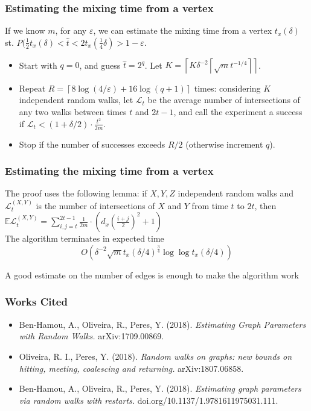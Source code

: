\documentclass{beamer}
\newcommand{\E}{\mathbb{E}}
\newcommand{\ceil}[1]{\left\lceil #1 \right\rceil}
\newcommand{\eps}{\varepsilon}
\begin{document}
\begin{frame}
\frametitle{Estimating the mixing time from a vertex}

If we know $m$, for any $\eps$, we can estimate the mixing time from a vertex $t_x(\delta)$ st. $P(\frac12t_x(\delta)<\hat{t}<2t_x(\frac14\delta)>1-\eps$.

\begin{itemize}
\item Start with $q=0$, and guess $\hat{t}=2^q$. Let $K = \ceil{K\delta^{-2}\ceil{\sqrt{m}t^{-1/4}}}$. 

\item Repeat $R = \ceil{8\log (4/\eps)+16\log(q+1)}$ times: considering $K$ independent random walks, let $\mathcal{L}_t$ be the average number of intersections of any two walks between times $t$ and $2t-1$, and call the experiment a success if $\mathcal{L}_t<(1+\delta/2)\cdot \frac{t^2}{2m}$. 

\item Stop if the number of successes exceeds $R/2$ (otherwise increment $q$).

\end{itemize}

\end{frame}

\begin{frame}
\frametitle{Estimating the mixing time from a vertex}

The proof uses the following lemma: if $X,Y,Z$ independent random walks and $\mathcal{L}_t^{(X,Y)}$ is the number of intersections of $X$ and $Y$ from time $t$ to $2t$, then $\E\mathcal{L}^{(X,Y)}_t = \sum_{i,j=t}^{2t-1}\frac1{2m}\cdot (d_x(\frac{i+j}2)^2 +1)$\bigskip\\

The algorithm terminates in expected time
\[
O(\delta^{-2}\sqrt{m}t_x(\delta/4)^{\frac34}\log\log t_x(\delta/4))
\]

A good estimate on the number of edges is enough to make the algorithm work
\end{frame}

\begin{frame}
\frametitle{Works Cited}
\begin{itemize}
    \item Ben-Hamou, A., Oliveira, R., Peres, Y. (2018). \textit{Estimating Graph Parameters with Random Walks.} arXiv:1709.00869.
    \item Oliveira, R. I., Peres, Y. (2018). \textit{Random walks on graphs: new bounds on hitting, meeting, coalescing and returning.} arXiv:1807.06858.
    \item Ben-Hamou, A., Oliveira, R., Peres, Y. (2018). \textit{Estimating graph parameters via random walks with restarts.} doi.org/10.1137/1.9781611975031.111.
\end{itemize}
\end{frame}
\end{document}
